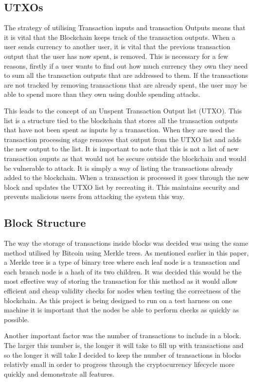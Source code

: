 \documentclass{l4proj}
\begin{document}
\subsection{UTXOs}
The strategy of utilising Transaction inputs and transaction Outputs means that it is vital that the Blockchain
keeps track of the transaction outputs. When a user sends currency to another user, it is vital that the previous 
transaction output that the user has now spent, is removed. This is necessary for a few reasons, 
firstly if a user wants to find out how much currency they own they need to sum all the transaction outputs that 
are addressed to them. If the transactions are not tracked by removing transactions that are already spent, the 
user may be able to spend more than they own using double spending attacks.

This leads to the concept of an Unspent Transaction Output list (UTXO). This list is a structure tied to the blockchain
that stores all the transaction outputs that have not been spent as inputs by a tranasction. When they are used 
the transaction processing stage removes that output from the UTXO list and adds the new output to the list.
It is important to note that this is not a list of new transaction ouputs as that would not be secure outside the
blockchain and would be vulnerable to attack. It is simply a way of listing the transactions already added to the
blockchain. When a transaction is processed it goes through the new block and updates the UTXO list by recreating 
it. This maintains security and prevents malicious users from attacking the system this way.

\subsection{Block Structure}
The way the storage of transactions inside blocks was decided was using the same method utilised by Bitcoin using
Merkle trees. As mentioned earlier in this paper, a Merkle tree is a type of binary tree where each leaf node
is a transaction and each branch node is a hash of its two children. It was decided this would be the most effective
way of storing the transaction for this method as it would allow efficient and cheap validity checks for nodes
when testing the correctness of the blockchain. As this project is being designed to run on a test harness on one
machine it is important that the nodes be able to perform checks as quickly as possible.

Another important factor was the number of transactions to include in a block. The larger this number is, the
longer it will take to fill up with transactions and so the longer it will take I decided to keep the 
number of transactions in blocks relativly small in order to progress through the cryptocurrency lifecycle
more quickly and demonstrate all features.
\end{document}
